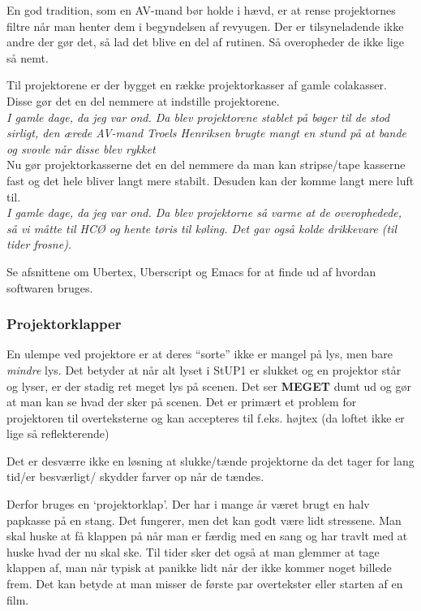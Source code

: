 \documentclass[10pt,a4paper,danish]{article}
\begin{document}
En god tradition, som en AV-mand bør holde i hævd, er at rense projektornes filtre
når man henter dem i begyndelsen af revyugen.
Der er tilsyneladende ikke andre der gør det, så lad det blive en del af
rutinen. Så overopheder de ikke lige så nemt.


Til projektorene er der bygget en række projektorkasser af gamle colakasser.
Disse gør det en del nemmere at indstille projektorene.\\
\textit{I gamle dage, da jeg var ond. Da blev projektorene stablet på bøger til
  de stod sirligt, den ærede AV-mand Troels Henriksen brugte mangt en stund på
  at bande og svovle når disse blev rykket}\\
Nu gør projektorkasserne det en del nemmere da man kan stripse/tape kasserne
fast og det hele bliver langt mere stabilt.
Desuden kan der komme langt mere luft til.\\
\textit{I gamle dage, da jeg var ond. Da blev projektorne så varme at de
  overophedede, så vi måtte til HCØ og hente tøris til køling. Det gav også
  kolde drikkevare (til tider frosne).}

Se afsnittene om Ubertex, Uberscript og Emacs for at finde ud af hvordan
softwaren bruges.

\subsubsection{Projektorklapper}
En ulempe ved projektore er at deres ``sorte'' ikke er mangel på lys, men bare
\textit{mindre} lys. Det betyder at når alt lyset i StUP1 er slukket og en
projektor står og lyser, er der stadig ret meget lys på scenen. Det ser
\textbf{MEGET} dumt ud og gør at man kan se hvad der sker på scenen.
Det er primært et problem for projektoren til overteksterne og kan accepteres
til f.eks. højtex (da loftet ikke er lige så reflekterende)

Det er desværre ikke en løsning at slukke/tænde projektorne da det tager for lang
tid/er besværligt/ skydder farver op når de tændes.

Derfor bruges en `projektorklap'. Der har i mange år været brugt en halv
papkasse på en stang. Det fungerer, men det kan godt være lidt stressene. Man
skal huske at få klappen på når man er færdig med en sang og har travlt med at
huske hvad der nu skal ske. Til tider sker det også at man glemmer at tage klappen
af, man når typisk at panikke lidt når der ikke kommer noget billede frem. Det
kan betyde at man misser de første par overtekster eller starten af en film.
\end{document}
